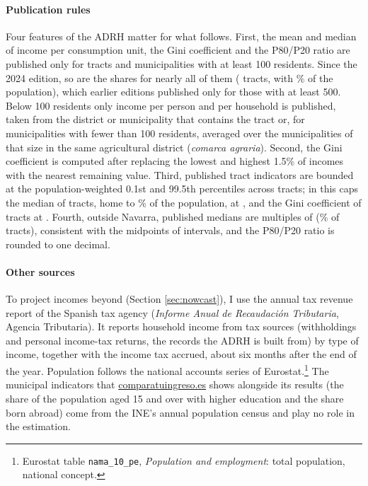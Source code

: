 \paragraph{Publication rules} Four features of the ADRH matter for what follows. First, the mean and median of income per consumption unit, the Gini coefficient and the P80/P20 ratio are published only for tracts and municipalities with at least 100 residents. Since the 2024 edition, so are the shares for nearly all of them (\ShareTracts{} tracts, with \ShareTractsPopPct{}\% of the population), which earlier editions published only for those with at least 500. Below 100 residents only income per person and per household is published, taken from the district or municipality that contains the tract or, for municipalities with fewer than 100 residents, averaged over the municipalities of that size in the same agricultural district (\textit{comarca agraria}). Second, the Gini coefficient is computed after replacing the lowest and highest 1.5\% of incomes with the nearest remaining value. Third, published tract indicators are bounded at the population-weighted 0.1st and 99.5th percentiles across tracts; in \BaseYear{} this caps the median of \CapTracts{} tracts, home to \CapPopPct{}\% of the population, at \texteuro\CapMedian{}, and the Gini coefficient of \CapGiniTracts{} tracts at \CapGini{}. Fourth, outside Navarra, published medians are multiples of  (\MedBinnedPct{}\% of tracts), consistent with the midpoints of  intervals, and the P80/P20 ratio is rounded to one decimal.

\paragraph{Other sources} To project incomes beyond \BaseYear{} (Section \ref{sec:nowcast}), I use the annual tax revenue report of the Spanish tax agency (\textit{Informe Anual de Recaudación Tributaria}, Agencia Tributaria). It reports household income from tax sources (withholdings and personal income-tax returns, the records the ADRH is built from) by type of income, together with the income tax accrued, about six months after the end of the year. Population follows the national accounts series of Eurostat.\footnote{Eurostat table \texttt{nama\_10\_pe}, \textit{Population and employment}: total population, national concept.} The municipal indicators that \href{https://comparatuingreso.es/}{\mbox{comparatuingreso.es}} shows alongside its results (the share of the population aged 15 and over with higher education and the share born abroad) come from the INE's annual population census and play no role in the estimation.

